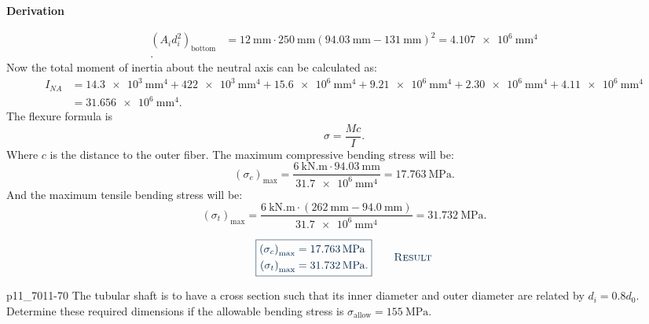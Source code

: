 \documentclass[a4paper]{article}
\newcounter{problem}
\numberwithin{equation}{problem}
\newcommand{\AUheading}[1]{%
  \par\vspace{.4\baselineskip}%
  {\sffamily\bfseries\color{AUblueDark}#1\par}%
  \nobreak%
}
\newenvironment{derivation}[1][Derivation]{%
  \AUheading{#1}
  \begingroup\allowdisplaybreaks
  \setlength{\abovedisplayskip}{6pt}%
  \setlength{\belowdisplayskip}{6pt}%
  \setlength{\abovedisplayshortskip}{4pt}%
  \setlength{\belowdisplayshortskip}{4pt}%
}{\par\endgroup\medskip}
\newcommand{\finalresult}[1]{%
  \vspace{.2\baselineskip}%
  \begin{equation}
    {\color{AUblueDark}\boxed{\displaystyle #1}}
    \tag*{\textsc{\textcolor{AUblueDark}{Result}}}
  \end{equation}
  \newpage
}
\begin{document}
\begin{derivation}
\begin{align*}
    \left( A_i d_i^2 \right)_{\text{bottom}} &= \qty{12}{\mm} \cdot \qty{250}{\mm} \left( \qty{94,03}{\mm} - \qty{131}{\mm} \right)^2 = \qty{4,107e6}{\mm^{4}}  \\
  .\end{align*}
  Now the total moment of inertia about the neutral axis can be calculated as:
  \begin{align*}
    I_{NA} &= \qty{14,3e3}{\mm^{4}} + \qty{422e3}{\mm^{4}} + \qty{15,6e6}{\mm^{4}} + \qty{9,21e6}{\mm^{4}} + \qty{2,30e6}{\mm^{4}} + \qty{4,11e6}{\mm^{4}}  \\
           &= \qty{31,656e6}{\mm^{4}} 
  .\end{align*}
  The flexure formula is
  \[ 
  \sigma = \frac{Mc}{I}
  .\]
  Where $c$ is the distance to the outer fiber.
  The maximum compressive bending stress will be:
  \[ 
  \left( \sigma_c \right)_{\mathrm{max}} = \frac{\qty{6}{\kN.\m} \cdot \qty{94,03}{\mm} }{\qty{31,7e6}{\mm^{4}}} = \qty{17,763}{\MPa} 
  .\]
  And the maximum tensile bending stress will be:
  \[ 
  \left( \sigma_t \right)_{\mathrm{max}} = \frac{\qty{6}{\kN.\m} \cdot \left( \qty{262}{\mm} - \qty{94,0}{\mm} \right)}{\qty{31,7e6}{\mm^{4}} } = \qty{31,732}{\MPa} 
  .\]
\end{derivation}

\finalresult{
\begin{aligned}
  \left( \sigma_c \right)_{\mathrm{max}} &= \qty{17,763}{\MPa} \\
  \left( \sigma_t \right)_{\mathrm{max}} &= \qty{31,732}{\MPa} 
.\end{aligned}
}

\begin{problemwithimage}{p11_70}{11-70}
  The tubular shaft is to have a cross section such that its inner diameter and outer diameter are related by $d_i = \num{0,8} d_0$.
  Determine these required dimensions if the allowable bending stress is $\sigma_{\text{allow}} = \qty{155}{\MPa}$.
\end{problemwithimage}
\end{document}
